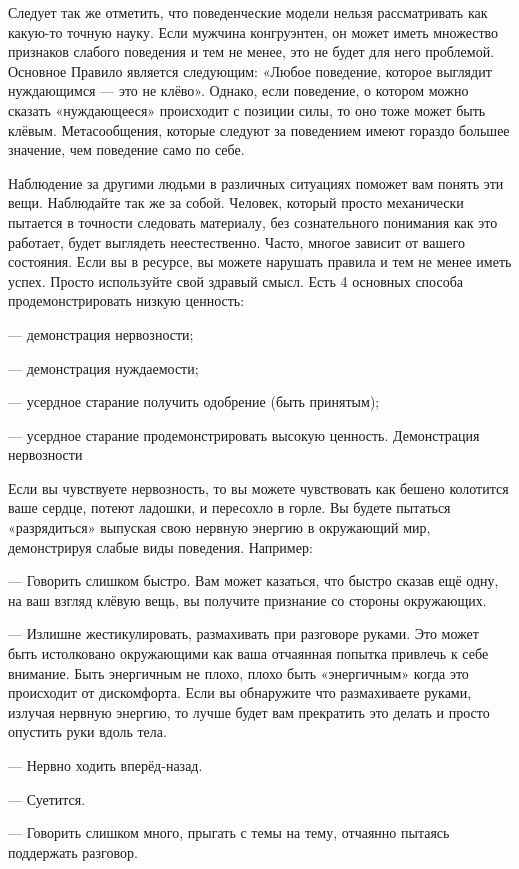Следует так же отметить, что поведенческие модели нельзя рассматривать как какую-то точную науку. Если мужчина конгруэнтен, он может иметь множество признаков слабого поведения и тем не менее, это не будет для него проблемой. Основное Правило является следующим: «Любое поведение, которое выглядит нуждающимся --- это не клёво». Однако, если поведение, о котором можно сказать «нуждающееся» происходит с позиции силы, то оно тоже может быть клёвым. Метасообщения, которые следуют за поведением имеют гораздо большее значение, чем поведение само по себе.

Наблюдение за другими людьми в различных ситуациях поможет вам понять эти вещи. Наблюдайте так же за собой. Человек, который просто механически пытается в точности следовать материалу, без сознательного понимания как это работает, будет выглядеть неестественно. Часто, многое зависит от вашего состояния. Если вы в ресурсе, вы можете нарушать правила и тем не менее иметь успех. Просто используйте свой здравый смысл. Есть 4 основных способа продемонстрировать низкую ценность:

--- демонстрация нервозности;

--- демонстрация нуждаемости;

--- усердное старание получить одобрение (быть принятым);

--- усердное старание продемонстрировать высокую ценность.
Демонстрация нервозности

Если вы чувствуете нервозность, то вы можете чувствовать как бешено колотится ваше сердце, потеют ладошки, и пересохло в горле. Вы будете пытаться «разрядиться» выпуская свою нервную энергию в окружающий мир, демонстрируя слабые виды поведения. Например:

--- Говорить слишком быстро. Вам может казаться, что быстро сказав ещё одну, на ваш взгляд клёвую вещь, вы получите признание со стороны окружающих.

--- Излишне жестикулировать, размахивать при разговоре руками. Это может быть истолковано окружающими как ваша отчаянная попытка привлечь к себе внимание. Быть энергичным не плохо, плохо быть «энергичным» когда это происходит от дискомфорта. Если вы обнаружите что размахиваете руками, излучая нервную энергию, то лучше будет вам прекратить это делать и просто опустить руки вдоль тела.

--- Нервно ходить вперёд-назад.

--- Суетится.

--- Говорить слишком много, прыгать с темы на тему, отчаянно пытаясь поддержать разговор.

